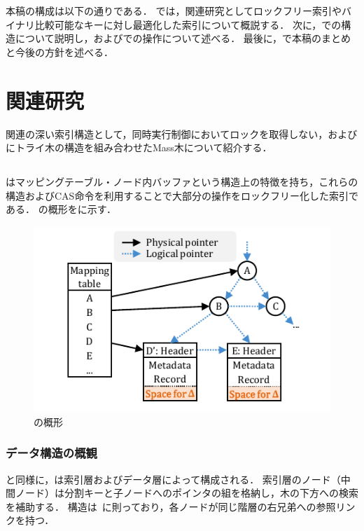 本稿の構成は以下の通りである．
\Sec{\ref{sec:relatedwork}}では，関連研究としてロックフリー索引やバイナリ比較可能なキーに対し最適化した索引について概説する．
次に，\Sec{\ref{sec:bc_forest_structure}}で\Bcforest{}の構造について説明し，\Sec{\ref{sec:node_operation}}および\Sec{\ref{sec:smo}}で\Bcforest{}の操作について述べる．
最後に，\Sec{\ref{sec:conclusion}}で本稿のまとめと今後の方針を述べる．

\section{関連研究}
\label{sec:relatedwork}
関連の深い索引構造として，同時実行制御においてロックを取得しない\Bctree{}，および\Bptree{}にトライ木の構造を組み合わせたMass木について紹介する．

\subsection{\Bctree{}}
\Bctree{}はマッピングテーブル・ノード内バッファという構造上の特徴を持ち，これらの構造およびCAS命令を利用することで大部分の操作をロックフリー化した索引である．
\Bctree{}の概形を\Fig{\ref{fig:bc_tree-structure}}に示す．

\begin{figure}[t]
    \centering
    \includegraphics{./figures/Bc-structure.pdf}
    \caption{\Bctree{}の概形}
    \label{fig:bc_tree-structure}
\end{figure}

\subsubsection{データ構造の概観}
\Bptree{}と同様に，\Bctree{}は索引層およびデータ層によって構成される．
索引層のノード（中間ノード）は分割キーと子ノードへのポインタの組を格納し，木の下方への検索を補助する．
構造は\Blinktree{}~\cite{tods1981:Lehman}に則っており，各ノードが同じ階層の右兄弟への参照リンクを持つ．

